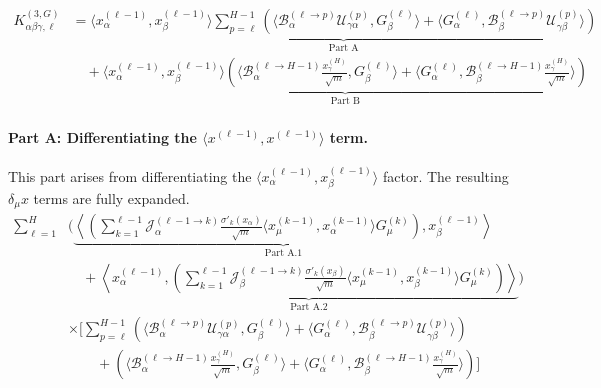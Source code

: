 \documentclass[11pt,a4paper]{article}
\theoremstyle{definition}
\begin{document}
\begin{align}
K^{(3, G)}_{\alpha\beta\gamma, \ell} &= \underbrace{\langle x^{(\ell-1)}_\alpha, x^{(\ell-1)}_\beta \rangle \sum_{p=\ell}^{H-1} \left( \langle \mathcal{B}^{(\ell \to p)}_{\alpha} \mathcal{U}^{(p)}_{\gamma\alpha}, G^{(\ell)}_\beta \rangle + \langle G^{(\ell)}_\alpha, \mathcal{B}^{(\ell \to p)}_{\beta} \mathcal{U}^{(p)}_{\gamma\beta} \rangle \right)}_{\text{Part A}} \nonumber \\
&\quad + \underbrace{\langle x^{(\ell-1)}_\alpha, x^{(\ell-1)}_\beta \rangle \left( \langle \mathcal{B}^{(\ell \to H-1)}_{\alpha} \frac{x^{(H)}_\gamma}{\sqrt{m}}, G^{(\ell)}_\beta \rangle + \langle G^{(\ell)}_\alpha, \mathcal{B}^{(\ell \to H-1)}_{\beta} \frac{x^{(H)}_\gamma}{\sqrt{m}} \rangle \right)}_{\text{Part B}}
\end{align}




\paragraph{Part A: Differentiating the $\langle x^{(\ell-1)}, x^{(\ell-1)} \rangle$ term.}
This part arises from differentiating the $\langle x^{(\ell-1)}_\alpha, x^{(\ell-1)}_\beta \rangle$ factor. The resulting $\delta_\mu x$ terms are fully expanded.
\begin{align}
\sum_{\ell=1}^{H} & \Biggl( \underbrace{\left\langle \left( \sum_{k=1}^{\ell-1} \mathcal{J}^{(\ell-1 \to k)}_{\alpha} \frac{\sigma'_{k}(x_\alpha)}{\sqrt{m}} \langle x^{(k-1)}_\mu, x^{(k-1)}_\alpha \rangle G^{(k)}_\mu \right), x^{(\ell-1)}_\beta \right\rangle}_{\text{Part A.1}} \nonumber \\
& \quad + \underbrace{\left\langle x^{(\ell-1)}_\alpha, \left( \sum_{k=1}^{\ell-1} \mathcal{J}^{(\ell-1 \to k)}_{\beta} \frac{\sigma'_{k}(x_\beta)}{\sqrt{m}} \langle x^{(k-1)}_\mu, x^{(k-1)}_\beta \rangle G^{(k)}_\mu \right) \right\rangle}_{\text{Part A.2}} \Biggr) \nonumber \\
& \times \Biggl[ \sum_{p=\ell}^{H-1} \left( \langle \mathcal{B}^{(\ell \to p)}_{\alpha} \mathcal{U}^{(p)}_{\gamma\alpha}, G^{(\ell)}_\beta \rangle + \langle G^{(\ell)}_\alpha, \mathcal{B}^{(\ell \to p)}_{\beta} \mathcal{U}^{(p)}_{\gamma\beta} \rangle \right) \nonumber \\
& \qquad + \left( \langle \mathcal{B}^{(\ell \to H-1)}_{\alpha} \frac{x^{(H)}_\gamma}{\sqrt{m}}, G^{(\ell)}_\beta \rangle + \langle G^{(\ell)}_\alpha, \mathcal{B}^{(\ell \to H-1)}_{\beta} \frac{x^{(H)}_\gamma}{\sqrt{m}} \rangle \right) \Biggr]
\end{align}
\end{document}
